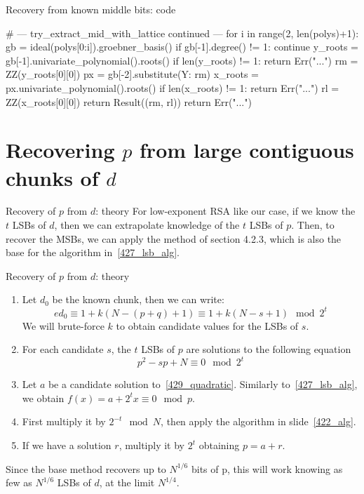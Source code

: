 \documentclass[usepdftitle=false]{beamer}
\begin{document}
\begin{frame}[fragile=singleslide]{Recovery from known middle bits: code}
\begin{python}
  # --- try_extract_mid_with_lattice continued ---
  for i in range(2, len(polys)+1):
    gb = ideal(polys[0:i]).groebner_basis()
    if gb[-1].degree() != 1:
      continue
    y_roots = gb[-1].univariate_polynomial().roots()
    if len(y_roots) != 1:
      return Err("...")
    rm = ZZ(y_roots[0][0])
    px = gb[-2].substitute({Y: rm})
    x_roots = px.univariate_polynomial().roots()
    if len(x_roots) != 1:
      return Err("...")
    rl = ZZ(x_roots[0][0])
    return Result((rm, rl))
  return Err("...")
\end{python}
\end{frame}

\section{Recovering $p$ from large contiguous chunks of $d$}
\begin{frame}{Recovery of $p$ from $d$: theory}\label{429_alg}
For low-exponent RSA like our case, if we know the $t$ LSBs of $d$, then we can extrapolate knowledge of
the $t$ LSBs of $p$. Then, to recover the MSBs, we can apply the method of section 4.2.3, which is also the base for the algorithm in~\ref{427_lsb_alg}.
\end{frame}
\begin{frame}{Recovery of $p$ from $d$: theory}
\begin{enumerate}
    \item Let $d_0$ be the known chunk, then we can write:
        $$
        e d_0 \equiv 1 + k(N - (p+q) + 1) \equiv 1 + k(N - s + 1) \mod 2^t 
        $$
        We will brute-force $k$ to obtain candidate values for the LSBs of $s$.
    \item For each candidate $s$, the $t$ LSBs of $p$ are solutions to the following equation
        \begin{equation}
            p^2 - sp + N \equiv 0 \mod 2^t\label{429_quadratic}
        \end{equation}
    \item Let $a$ be a candidate solution to~\ref{429_quadratic}. Similarly to~\ref{427_lsb_alg}, we
          obtain $f(x) = a + 2^t x \equiv 0 \mod p$.
    \item First multiply it by $2^{-t} \mod N$, then apply the algorithm in slide~\ref{422_alg}.
    \item If we have a solution $r$, multiply it by $2^t$ obtaining $p = a + r$.
\end{enumerate}

Since the base method recovers up to $N^{1/6}$ bits of p, this will work knowing as few as $N^{1/6}$ 
LSBs of $d$, at the limit $N^{1/4}$.
\end{frame}
\end{document}
